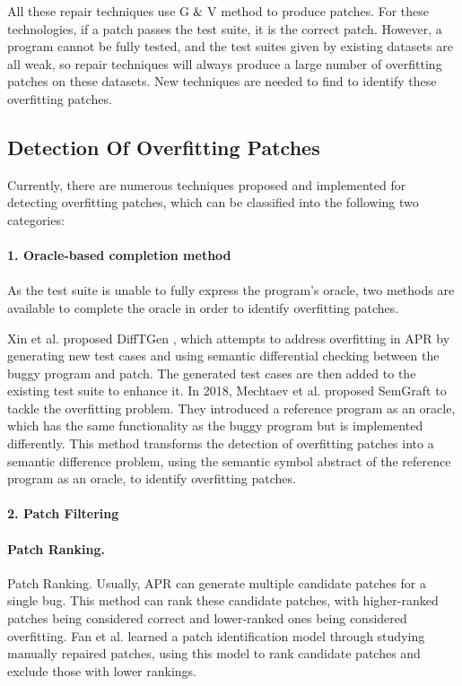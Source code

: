 All these repair techniques use G$\And$V method to produce patches. For these technologies, if a patch passes the test suite, it is the correct patch. However, a program cannot be fully tested, and the test suites given by existing datasets are all weak\cite{ref10}, so repair techniques will always produce a large number of overfitting patches on these datasets. New techniques are needed to find to identify these overfitting patches.

\subsection{Detection Of Overfitting Patches}
\label{2.2}
Currently, there are numerous techniques proposed and implemented for detecting overfitting patches, which can be classified into the following two categories:
\\ \hspace*{\fill} \\
\textbf{1. Oracle-based completion method}
\\ \hspace*{\fill} \\
As the test suite is unable to fully express the program’s oracle, two methods are available to complete the oracle in order to identify overfitting patches.

Xin et al. proposed DiffTGen \cite{ref49}, which attempts to address overfitting in APR by generating new test cases and using semantic differential checking between the buggy program and patch. The generated test cases are then added to the existing test suite to enhance it. In 2018, Mechtaev et al. proposed SemGraft \cite{ref50} to tackle the overfitting problem. They introduced a reference program as an oracle, which has the same functionality as the buggy program but is implemented differently. This method transforms the detection of overfitting patches into a semantic difference problem, using the semantic symbol abstract of the reference program as an oracle, to identify overfitting patches.
\\ \hspace*{\fill} \\
\textbf{2. Patch Filtering}
\paragraph{Patch Ranking.} Patch Ranking. Usually, APR can generate multiple candidate patches for a single bug. This method can rank these candidate patches, with higher-ranked patches being considered correct and lower-ranked ones being considered overfitting. Fan et al. \cite{ref51} learned a patch identification model through studying manually repaired patches, using this model to rank candidate patches and exclude those with lower rankings.
